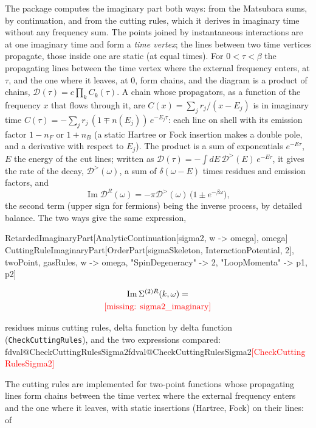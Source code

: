 \documentclass[11pt,a4paper]{article}
\makeatletter
\newcommand{\formula}[1]{\IfFileExists{figures/formula_#1.tex}{}{\text{\textcolor{red}{[missing: \detokenize{#1}]}}}}
\newcommand{\formulasplit}[1]{\IfFileExists{figures/formula_#1_split.tex}{}{\formula{#1}}}
\newcommand{\pkg}[1]{\texttt{#1}}
\newcommand{\val}[1]{\ifcsname fdval@#1\endcsname\csname fdval@#1\endcsname\else\textcolor{red}{[#1]}\fi}
\makeatother
\begin{document}
The package computes the imaginary part both ways: from the Matsubara sums, by continuation, and from the cutting rules,
which it derives in imaginary time without any frequency sum. The points joined by instantaneous interactions are at
one imaginary time and form a \emph{time vertex}; the lines between two time vertices propagate, those inside one are
static (at equal times). For $0<\tau<\beta$ the propagating lines between the time vertex where the external frequency enters, at $\tau$, and the one where it leaves, at 0, form chains, and the diagram
is a product of chains, $\mathcal D(\tau)=c\prod_kC_k(\tau)$. A chain whose propagators, as a function of the frequency $x$ that
flows through it, are $C(x)=\sum_jr_j/(x-E_j)$ is in imaginary time $C(\tau)=-\sum_jr_j\,(1\mp n(E_j))\,e^{-E_j\tau}$:
each line on shell with its emission factor $1-n_F$ or $1+n_B$ (a static Hartree or Fock insertion makes a double pole,
and a derivative with respect to $E_j$). The product is a sum of exponentials $e^{-E\tau}$, $E$ the energy of the cut
lines; written as $\mathcal D(\tau)=-\int dE\,\mathcal D^>(E)\,e^{-E\tau}$, it gives the rate of the decay, $\mathcal D^>(\omega)$, a sum of
$\delta(\omega-E)$ times residues and emission factors, and
\[
\operatorname{Im}\mathcal D^R(\omega)=-\pi \mathcal D^>(\omega)\,\bigl(1\pm e^{-\beta\omega}\bigr),
\]
the second term (upper sign for fermions) being the inverse process, by detailed balance. The two ways give the same
expression,
\begin{code}
RetardedImaginaryPart[AnalyticContinuation[sigma2, w -> omega], omega]
CuttingRuleImaginaryPart[OrderPart[sigmaSkeleton, InteractionPotential, 2], twoPoint,
    gasRules, w -> omega, "SpinDegeneracy" -> 2, "LoopMomenta" -> {p1, p2}]
\end{code}
\begin{outputbox}
\vspace{-6pt}
\begin{gather*}
\operatorname{Im}\Sigma^{(2)R}(k,\omega)=\\
\formulasplit{sigma2_imaginary}
\end{gather*}
\end{outputbox}
\begin{result}
residues minus cutting rules, delta function by delta function (\pkg{CheckCuttingRules}), and the two expressions
compared: \val{CheckCuttingRulesSigma2}
\end{result}
The cutting rules are implemented for two-point functions whose propagating lines form chains between the time vertex
where the external frequency enters and the one where it leaves, with static insertions (Hartree, Fock) on their lines: of
\end{document}
